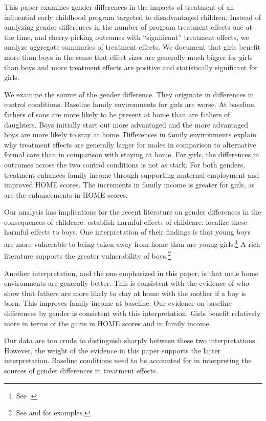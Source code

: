 This paper examines gender differences in the impacts of treatment of an influential early childhood program targeted to disadvantaged children. Instead of  analyzing gender differences in the number of program treatment effects one at the time, and cherry-picking outcomes with ``significant'' treatment effects, we analyze aggregate summaries of treatment effects. We document that girls benefit more than boys in the sense that effect sizes are generally much bigger for girls than boys and more treatment effects are positive and statistically significant for girls.

We examine the source of the gender difference. They originate in differences in control conditions. Baseline family environments for girls are worse. At baseline, fathers of sons are more likely to be present at home than are fathers of daughters. Boys initially start out more advantaged and the more advantaged boys are more likely to stay at home. Differences in family environments explain why treatment effects are generally larger for males in comparison to alternative formal care than in comparison with staying at home. For girls, the differences in outcomes across the two control conditions is not as stark. For both genders, treatment enhances family income through supporting maternal employment and improved HOME scores. The increments in family income is greater for girls, as are the enhancements in HOME scores.

Our analysis has implications for the recent literature on gender differences in the consequences of childcare. \citet{Baker_etal_2008_Universal_Childcare_JPE,Baker_Gruber_Milligan_2015_Noncog_Defects} establish harmful effects of childcare. \citet{Kottelenberg_Lehrer_2014_Gender-Effects} localize these harmful effects to boys. One interpretation of their findings is that young boys are more vulnerable to being taken away from home than are young girls.\footnote{See \citet{Garcia_etal_2019_ECE_IMHJ}.} A rich literature supports the greater vulnerability of boys.\footnote{See \citet{Golding_Fitzgerald_2017_IMHJ} and \citet{Schore_2017_IMHJ} for examples.}

Another interpretation, and the one emphasized in this paper, is that male home environments are generally better. This is consistent with the evidence of \citet{Dahl_Moretti_2008_RES} who show that fathers are more likely to stay at home with the mother if a boy is born. This improves family income at baseline. Our evidence on baseline differences by gender is consistent with this interpretation. Girls benefit relatively more in terms of the gains in HOME scores and in family income.

Our data are too crude to distinguish sharply between these two interpretations. However, the weight of the evidence in this paper supports the latter interpretation. Baseline conditions need to be accounted for in interpreting the sources of gender differences in treatment effects. 